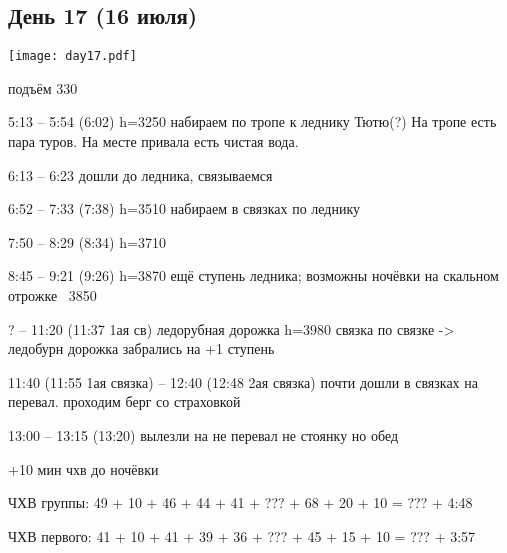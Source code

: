 \graphicspath{{Pictures/Chapter5/Day17}}


\subsection{День 17 (16 июля)}\label{subsec:Day17}
    \parbox[c]{\textwidth}{%
        \texttt{[image: day17.pdf]}\label{fig:Day17_map}%
    }
    \vspace{0.8cm}
    
подъём 330

5:13 --  5:54 (6:02) h=3250
набираем по тропе к леднику Тютю(?) На тропе есть пара туров. На месте привала есть чистая вода.

6:13 -- 6:23 дошли до ледника, связываемся

6:52 -- 7:33 (7:38) h=3510 набираем в связках по леднику

7:50 -- 8:29 (8:34) h=3710

8:45 -- 9:21 (9:26) h=3870
ещё ступень ледника; возможны ночёвки на скальном отрожке ~3850

? -- 11:20 (11:37 1ая св) ледорубная дорожка h=3980 связка по связке -> ледобурн дорожка
забрались на +1 ступень

11:40 (11:55 1ая связка) -- 12:40 (12:48 2ая связка)
почти дошли в связках на перевал. проходим берг со страховкой

13:00 -- 13:15 (13:20) вылезли на не перевал не стоянку но обед

+10 мин чхв до ночёвки


ЧХВ группы: 49 + 10 + 46 + 44 + 41 + ??? + 68 + 20 + 10 = ??? + 4:48

ЧХВ первого: 41 + 10 + 41 + 39 + 36 + ??? + 45 + 15 + 10 = ??? + 3:57

    \FloatBarrier
